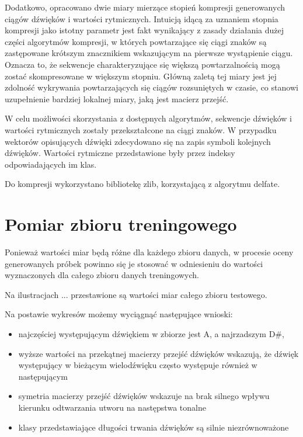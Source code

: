 {{        Dodatkowo, opracowano dwie miary mierzące stopień kompresji generowanych ciągów dźwięków i wartości rytmicznych. 
        Intuicją idącą za uznaniem stopnia kompresji jako istotny parametr jest fakt wynikający z zasady działania dużej części
        algorytmów kompresji, w których powtarzające się ciągi znaków są zastępowane krótszym znacznikiem wskazującym na pierwsze 
        wystąpienie ciągu. 
        Oznacza to, że sekwencje charakteryzujące się większą powtarzalnością mogą zostać skompresowane w większym stopniu.
        Główną zaletą tej miary jest jej zdolność wykrywania powtarzających się ciągów rozsuniętych w czasie, co stanowi uzupełnienie 
        bardziej lokalnej miary, jaką jest macierz przejść.

        W celu możliwości skorzystania z dostępnych algorytmów, sekwencje dźwięków i wartości rytmicznych zostały przekształcone
        na ciągi znaków. W przypadku wektorów opisujących dźwięki zdecydowano się na zapis symboli kolejnych dźwięków. Wartości
        rytmiczne przedstawione były przez indeksy odpowiadających im klas. 

        Do kompresji wykorzystano bibliotekę zlib, korzystającą z algorytmu delfate.
    }

    \section{Pomiar zbioru treningowego}
    {
        Ponieważ wartości miar będą różne dla każdego zbioru danych, w procesie oceny generowanych próbek powinno się je 
        stosować w odniesieniu do wartości wyznaczonych dla całego zbioru danych treningowych.
        
        Na ilustracjach ... przestawione są wartości miar całego zbioru testowego.






        Na postawie wykresów możemy wyciągnąć następujące wnioski:
        \begin{itemize}
            \item najczęściej występującym dźwiękiem w zbiorze jest A, a najrzadszym D\#,
            \item wyższe wartości na przekątnej macierzy przejść dźwięków wskazują, że dźwięk występujący w bieżącym wielodźwięku
            często występuje również w następującym
            \item symetria macierzy przejść dźwięków wskazuje na brak silnego wpływu kierunku odtwarzania utworu na następstwa tonalne
            \item klasy przedstawiające długości trwania dźwięków są silnie niezrównoważone
        \end{itemize}
    }

}
